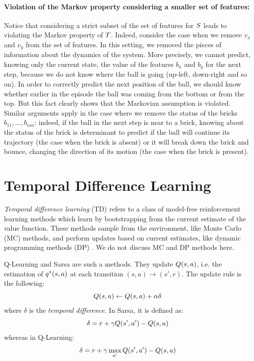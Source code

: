 \begin{example}
	\paragraph{Violation of the Markov property considering a smaller set of features:}
	Notice that considering a strict subset of the set of features for $S$ leads to violating the Markov property of $T$. Indeed, consider the case when we remove $v_x$ and $v_y$ from the set of features. In this setting, we removed the pieces of information about the dynamics of the system. More precisely, we cannot predict, knowing only the current state, the value of the features $b_x$ and $b_y$ for the next step, because we do not know where the ball is going (up-left, down-right and so on). In order to correctly predict the next position of the ball, we should know whether earlier in the episode the ball was coming from the bottom or from the top. But this fact clearly shows that the Markovian assumption is violated. Similar arguments apply in the case where we remove the status of the bricks $b_{11}, \dots, b_{nm}$: indeed, if the ball in the next step is near to a brick, knowing about the status of the brick is determinant to predict if the ball will continue its trajectory (the case when the brick is absent) or it will break down the brick and bounce, changing the direction of its motion (the case when the brick is present).
	
\end{example}

\section{Temporal Difference Learning}
\label{sect:temporal-difference-learning}
\emph{Temporal difference learning} (TD) \citep{Sutton1988} refers to a class of model-free reinforcement learning methods which learn by bootstrapping from the current estimate of the value function. These methods sample from the environment, like Monte Carlo (MC) methods, and perform updates based on current estimates, like dynamic programming methods (DP) \citep{Bellman:1957}. We do not discuss MC and DP methods here.

Q-Learning \citep{watkins1989learning, Watkins1992} and Sarsa are such a methods. They update $Q(s, a)$, i.e. the estimation of $q^*(s, a)$ at each transition $(s, a) \to (s', r)$. The update rule is the following:
\begin{equation}\label{td-update-rule}
Q(s, a) \leftarrow Q(s, a) + \alpha \delta
\end{equation}
where $\delta$ is the \emph{temporal difference}. In Sarsa, it is defined as:
\begin{equation}\label{def:temporal-difference}
\delta = r + \gamma Q(s', a') - Q(s, a)
\end{equation}
whereas in Q-Learning:
\begin{equation}
\delta = r + \gamma \max_{a'} Q(s', a') - Q(s, a)
\end{equation}

